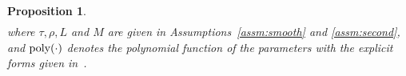 \documentclass{osudissert96}
\newtheorem{proposition}{Proposition}
\begin{document}
\begin{proposition}
\begin{align*}
\end{align*}
where $\tau,\rho,L$ and $M$ are given in Assumptions~\ref{assm:smooth} and \ref{assm:second}, and $\text{\normalfont poly}(\cdot)$ denotes the polynomial function of the parameters with the explicit forms 
given in~.
\end{proposition}

\end{document}
